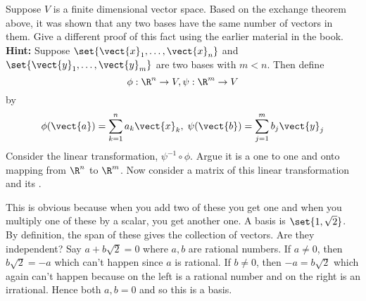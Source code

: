 \begin{ex} Suppose $V$ is a finite dimensional vector space. Based on the
exchange theorem above, it was shown that any two bases have the same number
of vectors in them. Give a different proof of this fact using the earlier
material in the book. \textbf{Hint: }Suppose $\set{\vect{x}_{1}
,\ldots,\vect{x}_{n}} $ and $\set{\vect{y}_{1},\ldots,\vect{y}
_{m}} $ are two bases with $m<n$. Then define
\begin{equation*}
\phi :\R^{n}\to V,\psi :\R^{m}\to V
\end{equation*}
by
\begin{equation*}
\phi (\vect{a}) = \sum_{k=1}^{n}a_{k}\vect{x}
_{k},\;\psi (\vect{b}) = \sum_{j=1}^{m}b_{j}\vect{y}_{j}
\end{equation*}
Consider the linear transformation, $\psi ^{-1}\circ \phi$. Argue it is a
one to one and onto mapping from $\R^{n}$ to $\R^{m}$. Now
consider a matrix of this linear transformation and its {\rref}.
\begin{sol}
This is obvious because
when you add two of these you get one and when you multiply one of these by
a scalar, you get another one. A basis is $\set{1,\sqrt{2}}$. By
definition, the span of these gives the collection of vectors. Are they
independent? Say $a+b\sqrt{2}=0$ where $a,b$ are rational numbers. If $a\neq
0$, then $b\sqrt{2}=-a$ which can't happen since $a$ is rational. If $b\neq
0$, then $-a=b\sqrt{2}$ which again can't happen because on the left is a
rational number and on the right is an irrational. Hence both $a,b=0$ and so
this is a basis.
\end{sol}
\end{ex}


